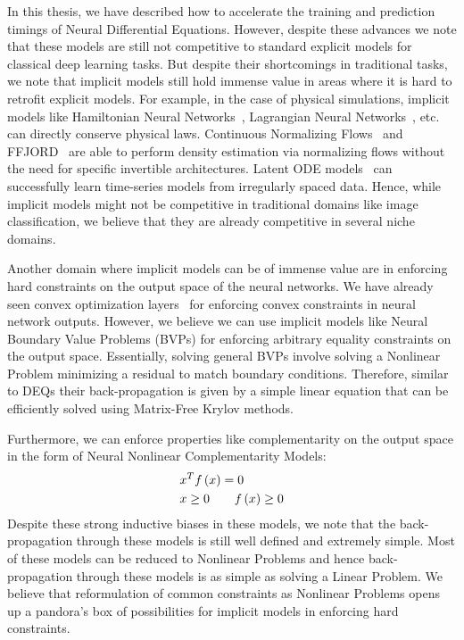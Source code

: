 In this thesis, we have described how to accelerate the training and prediction timings of Neural Differential Equations. However, despite these advances we note that these models are still not competitive to standard explicit models for classical deep learning tasks. But despite their shortcomings in traditional tasks, we note that implicit models still hold immense value in areas where it is hard to retrofit explicit models. For example, in the case of physical simulations, implicit models like Hamiltonian Neural Networks~\citep{greydanus2019hamiltonian}, Lagrangian Neural Networks~\citep{cranmer2020lagrangian}, etc. can directly conserve physical laws. Continuous Normalizing Flows~\citep{chen2018neural} and FFJORD~\citep{grathwohl2018ffjord} are able to perform density estimation via normalizing flows without the need for specific invertible architectures. Latent ODE models~\citep{rubanova2019latent} can successfully learn time-series models from irregularly spaced data. Hence, while implicit models might not be competitive in traditional domains like image classification, we believe that they are already competitive in several niche domains.

Another domain where implicit models can be of immense value are in enforcing hard constraints on the output space of the neural networks. We have already seen convex optimization layers~\citep{agrawal2019differentiable} for enforcing convex constraints in neural network outputs. However, we believe we can use implicit models like Neural Boundary Value Problems (BVPs) for enforcing arbitrary equality constraints on the output space. Essentially, solving general BVPs involve solving a Nonlinear Problem minimizing a residual to match boundary conditions. Therefore, similar to DEQs their back-propagation is given by a simple linear equation that can be efficiently solved using Matrix-Free Krylov methods.

Furthermore, we can enforce properties like complementarity on the output space in the form of Neural Nonlinear Complementarity Models:
%
\begin{align}
    &x^T f\left(x\right) = 0\\
    & x \geq 0 \qquad f\left(x\right) \geq 0
\end{align}
%
Despite these strong inductive biases in these models, we note that the back-propagation through these models is still well defined and extremely simple. Most of these models can be reduced to Nonlinear Problems and hence back-propagation through these models is as simple as solving a Linear Problem. We believe that reformulation of common constraints as Nonlinear Problems opens up a pandora's box of possibilities for implicit models in enforcing hard constraints.